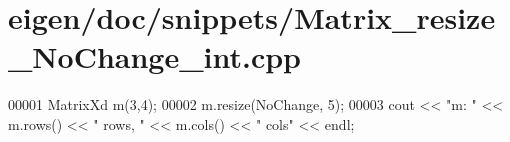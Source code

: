 \hypertarget{eigen_2doc_2snippets_2_matrix__resize___no_change__int_8cpp_source}{}\section{eigen/doc/snippets/\+Matrix\+\_\+resize\+\_\+\+No\+Change\+\_\+int.cpp}
\label{eigen_2doc_2snippets_2_matrix__resize___no_change__int_8cpp_source}

\begin{DoxyCode}
00001 MatrixXd m(3,4);
00002 m.resize(NoChange, 5);
00003 cout << \textcolor{stringliteral}{"m: "} << m.rows() << \textcolor{stringliteral}{" rows, "} << m.cols() << \textcolor{stringliteral}{" cols"} << endl;
\end{DoxyCode}
